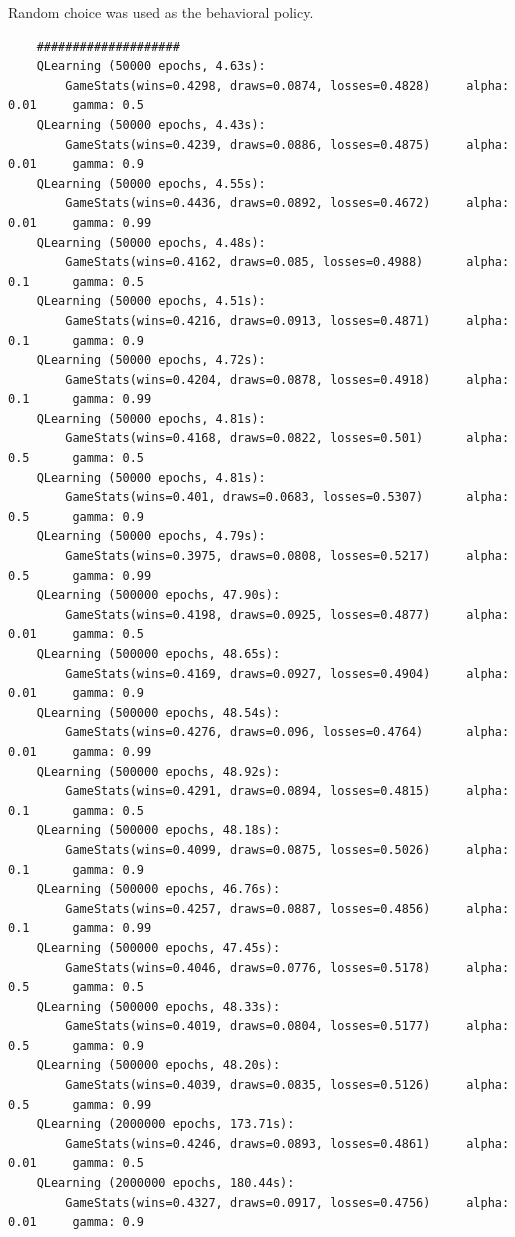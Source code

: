 \documentclass{article}
\begin{document}
Random choice was used as the behavioral policy.

\begin{verbatim}
    ####################
    QLearning (50000 epochs, 4.63s):
        GameStats(wins=0.4298, draws=0.0874, losses=0.4828)		alpha: 0.01		gamma: 0.5
    QLearning (50000 epochs, 4.43s):
        GameStats(wins=0.4239, draws=0.0886, losses=0.4875)		alpha: 0.01		gamma: 0.9
    QLearning (50000 epochs, 4.55s):
        GameStats(wins=0.4436, draws=0.0892, losses=0.4672)		alpha: 0.01		gamma: 0.99
    QLearning (50000 epochs, 4.48s):
        GameStats(wins=0.4162, draws=0.085, losses=0.4988)		alpha: 0.1		gamma: 0.5
    QLearning (50000 epochs, 4.51s):
        GameStats(wins=0.4216, draws=0.0913, losses=0.4871)		alpha: 0.1		gamma: 0.9
    QLearning (50000 epochs, 4.72s):
        GameStats(wins=0.4204, draws=0.0878, losses=0.4918)		alpha: 0.1		gamma: 0.99
    QLearning (50000 epochs, 4.81s):
        GameStats(wins=0.4168, draws=0.0822, losses=0.501)		alpha: 0.5		gamma: 0.5
    QLearning (50000 epochs, 4.81s):
        GameStats(wins=0.401, draws=0.0683, losses=0.5307)		alpha: 0.5		gamma: 0.9
    QLearning (50000 epochs, 4.79s):
        GameStats(wins=0.3975, draws=0.0808, losses=0.5217)		alpha: 0.5		gamma: 0.99
    QLearning (500000 epochs, 47.90s):
        GameStats(wins=0.4198, draws=0.0925, losses=0.4877)		alpha: 0.01		gamma: 0.5
    QLearning (500000 epochs, 48.65s):
        GameStats(wins=0.4169, draws=0.0927, losses=0.4904)		alpha: 0.01		gamma: 0.9
    QLearning (500000 epochs, 48.54s):
        GameStats(wins=0.4276, draws=0.096, losses=0.4764)		alpha: 0.01		gamma: 0.99
    QLearning (500000 epochs, 48.92s):
        GameStats(wins=0.4291, draws=0.0894, losses=0.4815)		alpha: 0.1		gamma: 0.5
    QLearning (500000 epochs, 48.18s):
        GameStats(wins=0.4099, draws=0.0875, losses=0.5026)		alpha: 0.1		gamma: 0.9
    QLearning (500000 epochs, 46.76s):
        GameStats(wins=0.4257, draws=0.0887, losses=0.4856)		alpha: 0.1		gamma: 0.99
    QLearning (500000 epochs, 47.45s):
        GameStats(wins=0.4046, draws=0.0776, losses=0.5178)		alpha: 0.5		gamma: 0.5
    QLearning (500000 epochs, 48.33s):
        GameStats(wins=0.4019, draws=0.0804, losses=0.5177)		alpha: 0.5		gamma: 0.9
    QLearning (500000 epochs, 48.20s):
        GameStats(wins=0.4039, draws=0.0835, losses=0.5126)		alpha: 0.5		gamma: 0.99
    QLearning (2000000 epochs, 173.71s):
        GameStats(wins=0.4246, draws=0.0893, losses=0.4861)		alpha: 0.01		gamma: 0.5
    QLearning (2000000 epochs, 180.44s):
        GameStats(wins=0.4327, draws=0.0917, losses=0.4756)		alpha: 0.01		gamma: 0.9

\end{verbatim}
\end{document}
